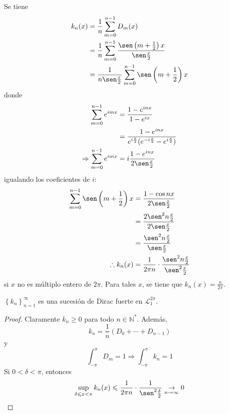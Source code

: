 \documentclass[12pt]{report}
\theoremstyle{largebreak}
\renewcommand{\leq}{\ensuremath{\leqslant}}
\renewcommand{\geq}{\ensuremath{\geqslant}}
\begin{document}
    Se tiene
    \begin{equation*}
        \begin{split}
            k_n(x)&=\frac{1}{n}\sum_{ m=0}^{ n-1}D_m(x)\\
            &=\frac{1}{n}\sum_{ m=0}^{ n-1}\frac{\sen\left(m+\frac{1}{2} \right)x}{\sen\frac{x}{2}}\\
            &=\frac{1}{n\sen\frac{x}{2}}\sum_{ m=0}^{ n-1}\sen\left(m+\frac{1}{2} \right)x\\
        \end{split}
    \end{equation*}
    donde
    \begin{equation*}
        \begin{split}
            \sum_{ m=0}^{ n-1}e^{ imx}&=\frac{1-e^{ inx}}{1-e^{ ix}}\\
            &=\frac{1-e^{ inx}}{e^{ i\frac{x}{2}}(e^{ -i\frac{x}{2}}-e^{ i\frac{x}{2}})}\\
            \Rightarrow \sum_{ m=0}^{ n-1}e^{ imx}&=i\frac{1-e^{ inx}}{2\sen\frac{x}{2}}\\
        \end{split}
    \end{equation*}
    igualando los coeficientes de $i$:
    \begin{equation*}
        \begin{split}
            \sum_{ m=0}^{ n-1}\sen\left(m+\frac{1}{2} \right)x&=\frac{1-\cos nx}{2\sen\frac{x}{2}}\\
            &=\frac{2\sen^2 n\frac{x}{2}}{2\sen\frac{x}{2}}\\
            &=\frac{\sen^2 n\frac{x}{2}}{\sen\frac{x}{2}}\\
            \therefore k_n(x)&=\frac{1}{2\pi n}\cdot\frac{\sen^2 n\frac{x}{2}}{\sen^2\frac{x}{2}}\\
        \end{split}
    \end{equation*}
    si $x$ no es múltiplo entero de $2\pi$. Para tales $x$, se tiene que $k_n(x)=\frac{n}{2\pi}$.

    \begin{propo}
        $\left\{k_n \right\}_{ n=1}^\infty$ es una sucesión de Dirac fuerte en $\mathcal{L}_1^{2\pi}$.
    \end{propo}

    \begin{proof}
        Claramente $k_n\geq 0$ para todo $n\in\mathbb{N}^*$. Además,
        \begin{equation*}
            k_n=\frac{1}{n}\left(D_0+\cdots+D_{ n-1} \right)
        \end{equation*}
        y
        \begin{equation*}
            \int_{ -\pi}^{\pi}D_m=1\Rightarrow \int_{ -\pi}^{ \pi}k_n=1
        \end{equation*}
        Si $0<\delta<\pi$, entonces
        \begin{equation*}
            \sup_{ \delta\leq x<\pi}k_n(x)\leq\frac{1}{2\pi n}\cdot\frac{1}{\sen^2\frac{\delta}{2}}\underset{n\rightarrow\infty}{\rightarrow}0
        \end{equation*}
    \end{proof}
\end{document}

